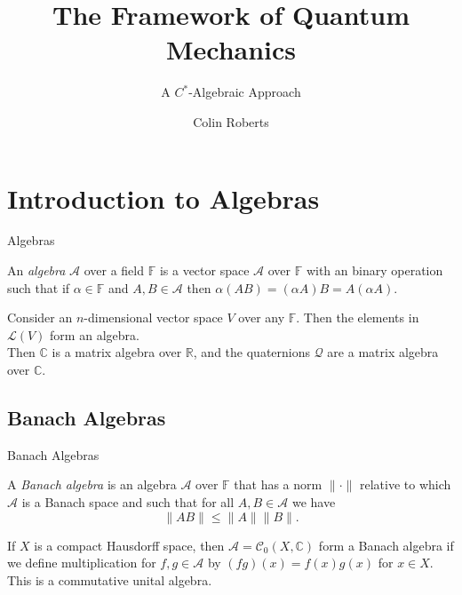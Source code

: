 \documentclass[pdf]{beamer}
\title{The Framework of Quantum Mechanics}
\subtitle{A $C^*$-Algebraic Approach}
\author{Colin Roberts}
\theoremstyle{definition}
\theoremstyle{theorem}
\newcommand{\R}{\mathbb{R}}
\newcommand{\F}{\mathbb{F}}
\newcommand{\A}{\mathcal{A}}
\newcommand{\C}{\mathbb{C}}
\begin{document}
{
\begin{frame}
\titlepage
\end{frame}
}


\section{Introduction to Algebras}
\begin{frame}{Algebras}
	\begin{definition}
	An \emph{algebra} $\A$ over a field $\F$ is a vector space $\A$ over $\F$ with an binary operation such that if $\alpha \in \F$ and $A,B\in \A$ then $\alpha(AB)=(\alpha A)B=A(\alpha A)$.
	\end{definition}
	\begin{example}
	Consider an $n$-dimensional vector space $V$ over any $\F$.  Then the elements in $\mathcal{L}(V)$ form an algebra.\\
	Then $\C$ is a matrix algebra over $\R$, and the quaternions $\mathcal{Q}$ are a matrix algebra over $\C$.
	\end{example}
\end{frame}

\subsection{Banach Algebras}
\begin{frame}{Banach Algebras}
	\begin{definition}
	A \emph{Banach algebra} is an algebra $\A$ over $\F$ that has a norm $\|\cdot \|$ relative to which $\A$ is a Banach space and such that for all $A,B\in \A$ we have
	\[
	\|AB\|\leq \|A\|\|B\|.
	\]
	\end{definition}
	
	\begin{example}
	If $X$ is a compact Hausdorff space, then $\A=\mathcal{C}_0(X,\C)$ form a Banach algebra if we define multiplication for $f,g\in \A$ by $(fg)(x)=f(x)g(x)$ for $x\in X$.  This is a commutative unital algebra.
	\end{example}
\end{frame}
\end{document}
